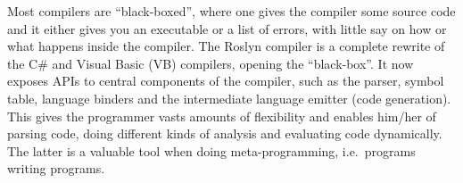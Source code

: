 Most compilers are ``black-boxed'', where one gives the compiler some source
code and it either gives you an executable or a list of errors, with little say
on how or what happens inside the compiler. The Roslyn compiler is a complete
rewrite of the C\# and Visual Basic (VB) compilers, opening the
``black-box''. It now exposes APIs to central components of the compiler, such
as the parser, symbol table, language binders and the intermediate language
emitter (code generation). This gives the programmer vasts amounts of
flexibility and enables him/her of parsing code, doing different kinds of
analysis and evaluating code dynamically. The latter is a valuable tool when
doing meta-programming, i.e.\ programs writing programs.

